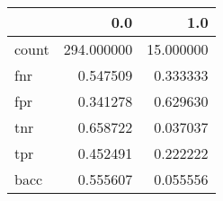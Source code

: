 \begin{tabular}{lrr}
\toprule
{} &         0.0 &        1.0 \\
\midrule
count &  294.000000 &  15.000000 \\
fnr   &    0.547509 &   0.333333 \\
fpr   &    0.341278 &   0.629630 \\
tnr   &    0.658722 &   0.037037 \\
tpr   &    0.452491 &   0.222222 \\
bacc  &    0.555607 &   0.055556 \\
\bottomrule
\end{tabular}
